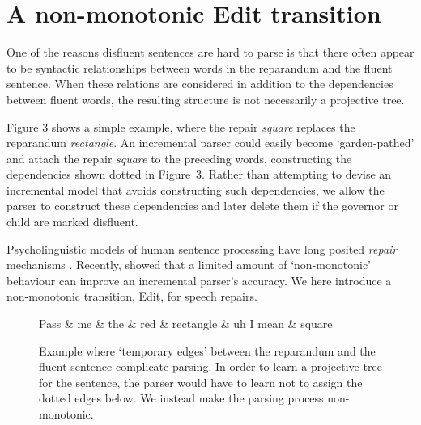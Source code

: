 \documentclass[11pt,letterpaper]{article}
\begin{document}
\section{A non-monotonic Edit transition}
\label{sec:edittrans}

One of the reasons disfluent sentences are hard to parse is that there often appear
to be syntactic relationships between words in the reparandum and the fluent sentence.
When these relations are considered in addition to the dependencies between fluent words,
the resulting structure is not necessarily a projective tree.

Figure 3 shows a simple example, where the repair {\em square} replaces the
reparandum {\em rectangle}.  An incremental parser could easily become
`garden-pathed' and attach the repair {\em square} to the preceding words,
constructing the dependencies shown dotted in Figure~3.  Rather than attempting
to devise an incremental model that avoids constructing such dependencies, we
allow the parser to construct these dependencies and later delete them if the governor
or child are marked disfluent.

Psycholinguistic models of human sentence processing have long posited
\emph{repair} mechanisms \citep{FrazierRayner1982}.  Recently, \citet{honnibal:13}
showed that a limited amount of `non-monotonic' behaviour can 
improve an incremental parser's accuracy.
We here introduce a non-monotonic transition, Edit, for speech
repairs. 

\begin{figure}
    \small
\begin{dependency}[theme=simple, segmented edge]
    \begin{deptext}[column sep=.075cm, row sep=.1ex]
    Pass \& me \& the \& red \& rectangle \& uh I mean \& square \\
    \end{deptext}
    \end{dependency}
    \caption{\small Example where `temporary edges' between the reparandum and the
    fluent sentence complicate parsing. In order to learn a projective tree
    for the sentence, the parser would have to learn not to assign the dotted
    edges below. We instead make the parsing process non-monotonic.
\label{fig:rectangle}}
\end{figure}
\end{document}
